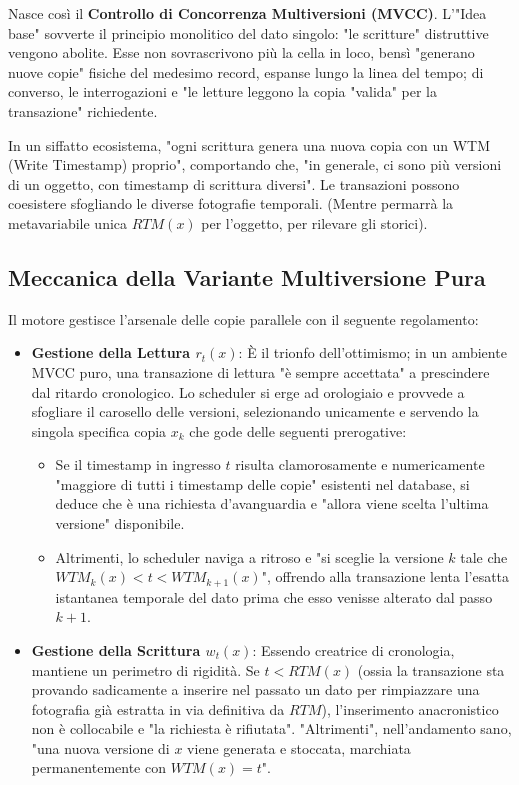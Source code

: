 Nasce così il \textbf{Controllo di Concorrenza Multiversioni (MVCC)}.
L'"Idea base" sovverte il principio monolitico del dato singolo: "le scritture" distruttive vengono abolite. Esse non sovrascrivono più la cella in loco, bensì "generano nuove copie" fisiche del medesimo record, espanse lungo la linea del tempo; di converso, le interrogazioni e "le letture leggono la copia "valida" per la transazione" richiedente.

In un siffatto ecosistema, "ogni scrittura genera una nuova copia con un WTM (Write Timestamp) proprio", comportando che, "in generale, ci sono più versioni di un oggetto, con timestamp di scrittura diversi". Le transazioni possono coesistere sfogliando le diverse fotografie temporali. (Mentre permarrà la metavariabile unica $RTM(x)$ per l'oggetto, per rilevare gli storici).

\subsection{Meccanica della Variante Multiversione Pura}
Il motore gestisce l'arsenale delle copie parallele con il seguente regolamento:
\begin{itemize}
    \item \textbf{Gestione della Lettura $r_t(x)$}: È il trionfo dell'ottimismo; in un ambiente MVCC puro, una transazione di lettura "è sempre accettata" a prescindere dal ritardo cronologico. Lo scheduler si erge ad orologiaio e provvede a sfogliare il carosello delle versioni, selezionando unicamente e servendo la singola specifica copia $x_k$ che gode delle seguenti prerogative:
    \begin{itemize}
        \item Se il timestamp in ingresso $t$ risulta clamorosamente e numericamente "maggiore di tutti i timestamp delle copie" esistenti nel database, si deduce che è una richiesta d'avanguardia e "allora viene scelta l'ultima versione" disponibile.
        \item Altrimenti, lo scheduler naviga a ritroso e "si sceglie la versione $k$ tale che $WTM_k(x) < t < WTM_{k+1}(x)$", offrendo alla transazione lenta l'esatta istantanea temporale del dato prima che esso venisse alterato dal passo $k+1$.
    \end{itemize}
    \item \textbf{Gestione della Scrittura $w_t(x)$}: Essendo creatrice di cronologia, mantiene un perimetro di rigidità. Se $t < RTM(x)$ (ossia la transazione sta provando sadicamente a inserire nel passato un dato per rimpiazzare una fotografia già estratta in via definitiva da $RTM$), l'inserimento anacronistico non è collocabile e "la richiesta è rifiutata". "Altrimenti", nell'andamento sano, "una nuova versione di $x$ viene generata e stoccata, marchiata permanentemente con $WTM(x) = t$".
\end{itemize}

